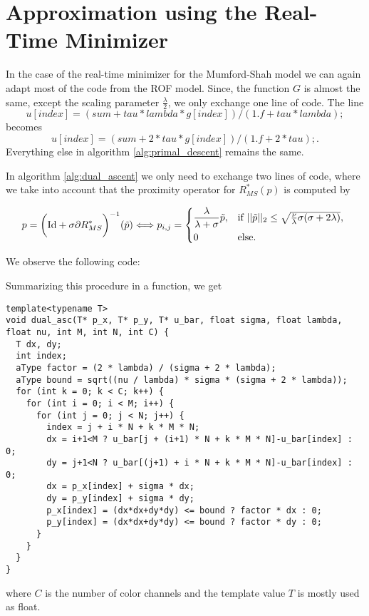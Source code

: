 
\section{Approximation using the Real-Time Minimizer} %
\label{sec:approximation_using_the_real_time_minimizer}
    
    In the case of the real-time minimizer for the Mumford-Shah model we can again adapt most of the code from the ROF model. Since, the function $G$ is almost the same, except the scaling parameter $\frac{\lambda}{2}$, we only exchange one line of code. The line
        $$
            u[index] = (sum + tau * lambda * g[index]) / (1.f + tau * lambda);
        $$
    becomes
        $$
            u[index] = (sum + 2 * tau * g[index]) / (1.f + 2 * tau);.
        $$
    Everything else in algorithm \ref{alg:primal_descent} remains the same.

    In algorithm \ref{alg:dual_ascent} we only need to exchange two lines of code, where we take into account that the proximity operator for $R_{MS}^{\ast}(p)$ is computed by

        $$
            p = \bigg( \textnormal{Id} + \sigma \partial R_{MS}^{\ast} \bigg)^{-1}(\tilde{p}) \Longleftrightarrow p_{i,j} =
                \begin{dcases*}
                    \frac{\lambda}{\lambda + \sigma} \tilde{p}, & \textnormal{if $||\tilde{p}||_{2} \le \sqrt{\frac{\nu}{\lambda}\sigma(\sigma + 2\lambda)}$,} \\
                    0 & \textnormal{else.}
                \end{dcases*}
        $$

    We observe the following code:

        \begin{algorithm}
            Summarizing this procedure in a function, we get
            \begin{lstlisting}
template<typename T>
void dual_asc(T* p_x, T* p_y, T* u_bar, float sigma, float lambda, float nu, int M, int N, int C) {
  T dx, dy;
  int index;
  aType factor = (2 * lambda) / (sigma + 2 * lambda);
  aType bound = sqrt((nu / lambda) * sigma * (sigma + 2 * lambda));
  for (int k = 0; k < C; k++) {
    for (int i = 0; i < M; i++) {
      for (int j = 0; j < N; j++) {
        index = j + i * N + k * M * N;
        dx = i+1<M ? u_bar[j + (i+1) * N + k * M * N]-u_bar[index] : 0;
        dy = j+1<N ? u_bar[(j+1) + i * N + k * M * N]-u_bar[index] : 0;
        dx = p_x[index] + sigma * dx;
        dy = p_y[index] + sigma * dy;
        p_x[index] = (dx*dx+dy*dy) <= bound ? factor * dx : 0;
        p_y[index] = (dx*dx+dy*dy) <= bound ? factor * dy : 0;
      }
    }
  }
}
            \end{lstlisting}
            where $C$ is the number of color channels and the template value $T$ is mostly used as float.
        \end{algorithm}

